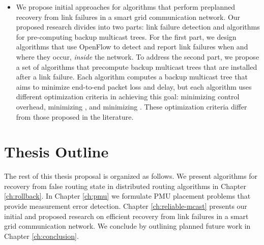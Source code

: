 \begin{itemize}
	\item We propose initial approaches for algorithms that perform preplanned recovery from link failures in a smart grid communication network.
	Our proposed research divides into two parts: link failure detection and algorithms for pre-computing backup multicast trees.  For the first part, we design algorithms 
	that use OpenFlow to detect and report link failures when and where they occur, \emph{inside} the network.  To address the second part, we 
	propose a set of algorithms that precompute backup multicast trees that are installed after a link failure.  Each algorithm computes a backup multicast tree that aims to
	minimize end-to-end packet loss and delay, but each algorithm uses different optimization criteria in achieving this goal: 
	minimizing control overhead, minimizing , and minimizing
	.
	These optimization criteria differ from those proposed in the literature.

		

\end{itemize}




\section{Thesis Outline}

The rest of this thesis proposal is organized as follows.  We present algorithms for recovery from false routing state in distributed routing algorithms in Chapter \ref{ch:rollback}.  
In Chapter \ref{ch:pmu} we formulate PMU placement problems that provide measurement error detection.  Chapter \ref{ch:reliable-mcast} presents our initial and proposed research on 
efficient recovery from link failures in a smart grid communication network.  We conclude by outlining planned future work in Chapter \ref{ch:conclusion}.

